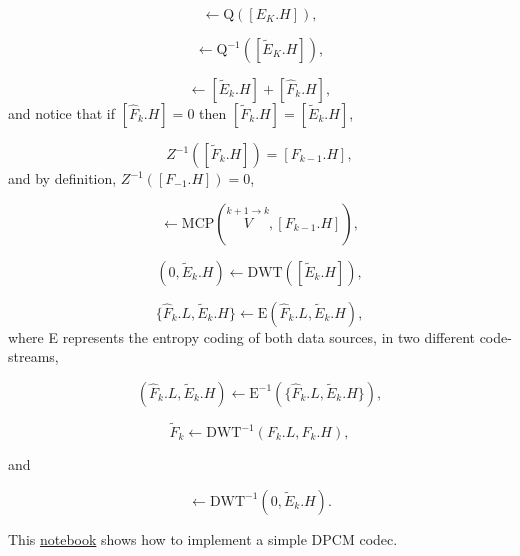 \begin{equation}
  [\tilde{E}_k.H] \leftarrow \text{Q}([E_K.H]),
  \tag{j}
\end{equation}

\begin{equation}
  [\tilde{E}_k.H] \leftarrow  \text{Q}^{-1}([\tilde{E}_K.H]),
  \tag{k}
\end{equation}

\begin{equation}
  [\tilde{F}_k.H] \leftarrow [\tilde{E}_k.H] + [\hat{F}_k.H],
  \tag{l}
\end{equation}
and notice that if $[\hat{F}_k.H]=0$ then $[\tilde{F}_k.H] =
[\tilde{E}_k.H]$,

\begin{equation}
  Z^{-1}([\tilde{F}_k.H]) = [F_{k-1}.H],
  \tag{m}
\end{equation}
and by definition, $Z^{-1}([F_{-1}.H]) = 0$,

\begin{equation}
  [\hat{F}_k.H] \leftarrow \text{MCP}(\overset{k+1\rightarrow k}{V}, [F_{k-1}.H]),
  \tag{n}
\end{equation}

\begin{equation}
  (0, \tilde{E}_k.H) \leftarrow \text{DWT}([\tilde{E}_k.H]),
  \tag{o}
\end{equation}

\begin{equation}
  \{\hat{F}_k.L, \tilde{E}_k.H\} \leftarrow \text{E}(\hat{F}_k.L, \tilde{E}_k.H),
  \tag{p}
\end{equation}
where E represents the entropy coding of both data sources, in two
different code-streams,

\begin{equation}
  (\hat{F}_k.L, \tilde{E}_k.H) \leftarrow \text{E}^{-1}(\{\hat{F}_k.L, \tilde{E}_k.H\}),
  \tag{q}
\end{equation}

\begin{equation}
  \tilde{F}_k \leftarrow \text{DWT}^{-1}(F_k.L, F_k.H),
  \tag{r}
\end{equation}

and

\begin{equation}
  [\tilde{E}_k.H] \leftarrow \text{DWT}^{-1}(0, \tilde{E}_k.H).
  \tag{s}
\end{equation}

This
\href{https://github.com/Sistemas-Multimedia/Sistemas-Multimedia.github.io/blob/master/milestones/12-IPP_coding/DPCM.ipynb}{notebook}
shows how to implement a simple DPCM codec.

